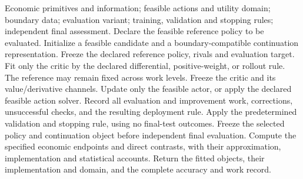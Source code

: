 \begin{algorithm}[t]
\caption{Neural Bellman evaluation, feasible improvement, and economic assessment}\label{alg:nbo}
\begin{algorithmic}[1]
\Require Economic primitives and information; feasible actions and utility domain; boundary data; evaluation variant; training, validation and stopping rules; independent final assessment.
\State Declare the feasible reference policy to be evaluated. Initialize a feasible candidate and a boundary-compatible continuation representation.
 \State Freeze the declared reference policy, rivals and evaluation target. Fit only the critic by the declared differential, positive-weight, or rollout rule. The reference may remain fixed across work levels.
 \State Freeze the critic and its value/derivative channels. Update only the feasible actor, or apply the declared feasible action solver.
 \State Record all evaluation and improvement work, corrections, unsuccessful checks, and the resulting deployment rule.
 \State Apply the predetermined validation and stopping rule, using no final-test outcomes.
\EndFor
\State Freeze the selected policy and continuation object before independent final evaluation.
\State Compute the specified economic endpoints and direct contrasts, with their approximation, implementation and statistical accounts.
\State Return the fitted objects, their implementation and domain, and the complete accuracy and work record.
\end{algorithmic}
\end{algorithm}
